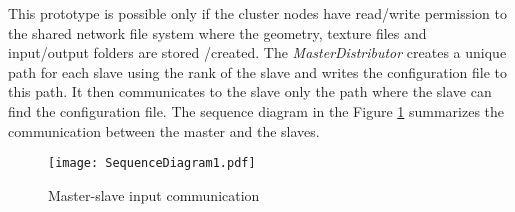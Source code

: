


This prototype is possible only if the cluster nodes have read/write permission to the shared network file system where the geometry, texture files and input/output folders are stored /created. The \textit{MasterDistributor} creates a unique path for each slave using the rank of the slave and writes the configuration file to this path. It then communicates to the slave only the path where the slave can find the configuration file. The sequence diagram in the Figure \ref{fig:SequenceDiagram1} summarizes the communication between the master and the slaves.  

\begin{figure}[ht!]
\centering
\texttt{[image: SequenceDiagram1.pdf]}
\caption{Master-slave input communication}
\label{fig:SequenceDiagram1}
\end{figure}

